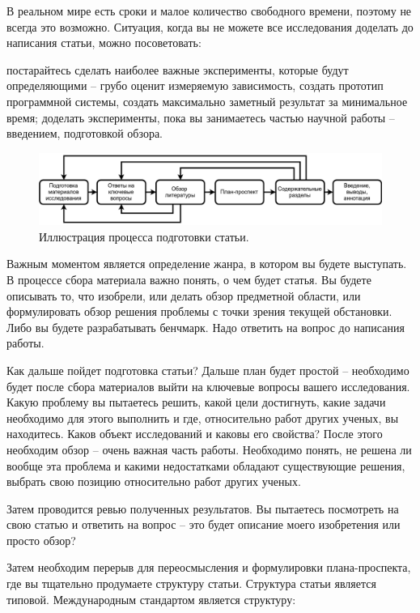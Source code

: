 \documentclass{report}
\begin{document}
В реальном мире есть сроки и малое количество свободного времени, поэтому не всегда это возможно. Ситуация, когда вы не можете все исследования доделать до написания статьи, можно посоветовать:

постарайтесь сделать наиболее важные эксперименты, которые будут определяющими – грубо оценит измеряемую зависимость, создать прототип программной системы, создать максимально заметный результат за минимальное время;
доделать эксперименты, пока вы занимаетесь частью научной работы – введением, подготовкой обзора.


\begin{figure}[H]
	\centering
	\includegraphics[width=13cm]{podgotovka_chernovika}
	\caption{Иллюстрация процесса подготовки статьи.}
\end{figure}

Важным моментом является определение жанра, в котором вы будете выступать. В процессе сбора материала важно понять, о чем будет статья. Вы будете описывать то, что изобрели, или делать обзор предметной области, или формулировать обзор решения проблемы с точки зрения текущей обстановки. Либо вы будете разрабатывать бенчмарк. Надо ответить на вопрос до написания работы.

Как дальше пойдет подготовка статьи? Дальше план будет простой – необходимо будет после сбора материалов выйти на ключевые вопросы вашего исследования. Какую проблему вы пытаетесь решить, какой цели достигнуть, какие задачи необходимо для этого выполнить и где, относительно работ других ученых, вы находитесь. Каков объект исследований и каковы его свойства? После этого необходим обзор – очень важная часть работы. Необходимо понять, не решена ли вообще эта проблема и какими недостатками обладают существующие решения, выбрать свою позицию относительно работ других ученых.

Затем проводится ревью полученных результатов. Вы пытаетесь посмотреть на свою статью и ответить на вопрос – это будет описание моего изобретения или просто обзор?

Затем необходим перерыв для переосмысления и формулировки плана-проспекта, где вы тщательно продумаете структуру статьи. Структура статьи является типовой. Международным стандартом является структуру:
\end{document}
